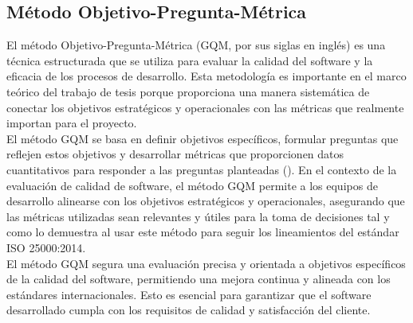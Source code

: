 \subsection{Método Objetivo-Pregunta-Métrica}
El método Objetivo-Pregunta-Métrica (GQM, por sus siglas en inglés) es una técnica estructurada que se utiliza para evaluar la calidad del software y la eficacia de los procesos de desarrollo. Esta metodología es importante en el marco teórico del trabajo de tesis porque proporciona una manera sistemática de conectar los objetivos estratégicos y operacionales con las métricas que realmente importan para el proyecto.\\ \indent
El método GQM se basa en definir objetivos específicos, formular preguntas que reflejen estos objetivos y desarrollar métricas que proporcionen datos cuantitativos para responder a las preguntas planteadas (\cite{van1999goal}). En el contexto de la evaluación de calidad de software, el método GQM permite a los equipos de desarrollo alinearse con los objetivos estratégicos y operacionales, asegurando que las métricas utilizadas sean relevantes y útiles para la toma de decisiones tal y como lo demuestra \textcite{lavadenzplataforma} al usar este método para seguir los lineamientos del estándar ISO 25000:2014.\\ \indent
El método GQM segura una evaluación precisa y orientada a objetivos específicos de la calidad del software, permitiendo una mejora continua y alineada con los estándares internacionales. Esto es esencial para garantizar que el software desarrollado cumpla con los requisitos de calidad y satisfacción del cliente.


